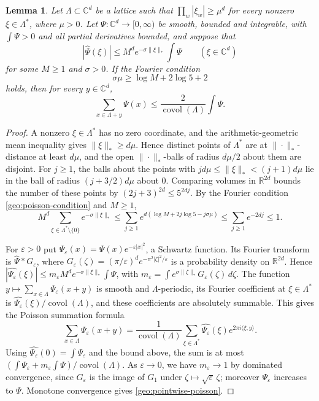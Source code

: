 \documentclass[11pt]{amsart}
\numberwithin{equation}{section}
\newtheorem{lemma}[equation]{Lemma}
\theoremstyle{definition}
\theoremstyle{remark}
\DeclareMathOperator{\covol}{covol}
\newcommand{\R}{\mathbb R}
\newcommand{\C}{\mathbb C}
\begin{document}
\begin{lemma}\label{geo:poisson}
Let $\Lambda\subset\C^d$ be a lattice such that
$\prod_w|\xi_w|\ge\mu^d$ for every nonzero $\xi\in\Lambda^*$, where
$\mu>0$. Let $\Psi\colon\C^d\to[0,\infty)$ be smooth, bounded and
integrable, with $\int\Psi>0$ and all partial derivatives bounded, and
suppose that
\[
 |\widehat\Psi(\xi)|\le M^de^{-\sigma\|\xi\|_*}\int\Psi
 \qquad(\xi\in\C^d)
\]
for some $M\ge1$ and $\sigma>0$. If the \emph{Fourier condition}
\begin{equation}\label{geo:poisson-condition}
 \sigma\mu\ge\log M+2\log5+2
\end{equation}
holds, then for every $y\in\C^d$,
\begin{equation}\label{geo:pointwise-poisson}
 \sum_{x\in\Lambda+y}\Psi(x)\le\frac2{\covol(\Lambda)}\int\Psi.
\end{equation}
\end{lemma}

\begin{proof}
A nonzero $\xi\in\Lambda^*$ has no zero coordinate, and the
arithmetic-geometric mean inequality gives $\|\xi\|_*\ge d\mu$. Hence
distinct points of $\Lambda^*$ are at $\|\cdot\|_*$-distance at least
$d\mu$, and the open $\|\cdot\|_*$-balls of radius $d\mu/2$ about them
are disjoint. For $j\ge1$, the balls about the points with
$jd\mu\le\|\xi\|_*<(j+1)d\mu$ lie in the ball of radius $(j+3/2)d\mu$
about $0$. Comparing volumes in $\R^{2d}$ bounds the number of these
points by $(2j+3)^{2d}\le5^{2dj}$. By the Fourier condition
\eqref{geo:poisson-condition} and
$M\ge1$,
\[
 M^d\sum_{\xi\in\Lambda^*\setminus\{0\}}e^{-\sigma\|\xi\|_*}
 \le\sum_{j\ge1}e^{d(\log M+2j\log5-j\sigma\mu)}
 \le\sum_{j\ge1}e^{-2dj}\le1 .
\]

For $\varepsilon>0$ put $\Psi_\varepsilon(x)=\Psi(x)e^{-\varepsilon|x|^2}$, a Schwartz
function. Its Fourier transform is $\widehat\Psi*G_\varepsilon$, where
$G_\varepsilon(\zeta)=(\pi/\varepsilon)^de^{-\pi^2|\zeta|^2/\varepsilon}$ is a probability
density on $\R^{2d}$. Hence
$|\widehat{\Psi_\varepsilon}(\xi)|\le m_\varepsilon M^de^{-\sigma\|\xi\|_*}\int\Psi$,
with $m_\varepsilon=\int e^{\sigma\|\zeta\|_*}G_\varepsilon(\zeta)\,d\zeta$. The function
$y\mapsto\sum_{x\in\Lambda}\Psi_\varepsilon(x+y)$ is smooth and
$\Lambda$-periodic, its Fourier coefficient at $\xi\in\Lambda^*$ is
$\widehat{\Psi_\varepsilon}(\xi)/\covol(\Lambda)$, and these coefficients are
absolutely summable. This gives the Poisson summation formula
\[
 \sum_{x\in\Lambda}\Psi_\varepsilon(x+y)
 =\frac1{\covol(\Lambda)}\sum_{\xi\in\Lambda^*}\widehat{\Psi_\varepsilon}(\xi)
 e^{2\pi i\langle\xi,y\rangle}.
\]
Using $\widehat{\Psi_\varepsilon}(0)=\int\Psi_\varepsilon$ and the bound above, the sum
is at most $(\int\Psi_\varepsilon+m_\varepsilon\int\Psi)/\covol(\Lambda)$. As
$\varepsilon\to0$, we have $m_\varepsilon\to1$ by dominated convergence, since
$G_\varepsilon$ is the image of $G_1$ under $\zeta\mapsto\sqrt\varepsilon\,\zeta$;
moreover $\Psi_\varepsilon$ increases to $\Psi$. Monotone convergence gives
\eqref{geo:pointwise-poisson}.
\end{proof}
\end{document}
